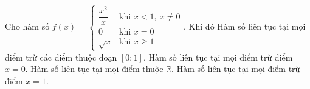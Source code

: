 \begin{ex}
Cho hàm số $f(x)=\begin{cases}\dfrac{x^2}x&\text{khi }x<1,\ x\ne0\\0&\text{khi }x=0\\\sqrt x&\text{khi }x\ge1\end{cases}$. Khi đó
\choiceTF
{Hàm số liên tục tại mọi điểm trừ các điểm thuộc đoạn $[0;1]$.}
{Hàm số liên tục tại mọi điểm trừ điểm $x=0$.}
{\True Hàm số liên tục tại mọi điểm thuộc $\mathbb R$.}
{Hàm số liên tục tại mọi điểm trừ điểm $x=1$.}
\end{ex}
